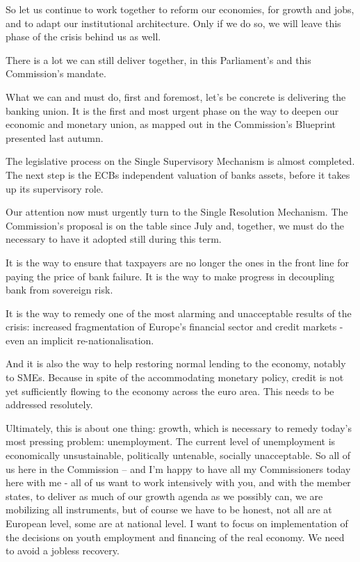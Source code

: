 \documentclass[a4paper,11pt]{article}
\begin{document}
So let us continue to work together to reform our economies, for growth and jobs, and to adapt our institutional architecture. Only if we do so, we will leave this phase of the crisis behind us as well.

There is a lot we can still deliver together, in this Parliament's and this Commission's mandate.

What we can and must do, first and foremost, let's be concrete is delivering the banking union. It is the first and most urgent phase on the way to deepen our economic and monetary union, as mapped out in the Commission's Blueprint presented last autumn.

The legislative process on the Single Supervisory Mechanism is almost completed. The next step is the ECBs independent valuation of banks assets, before it takes up its supervisory role.

Our attention now must urgently turn to the Single Resolution Mechanism. The Commission's proposal is on the table since July and, together, we must do the necessary to have it adopted still during this term.

It is the way to ensure that taxpayers are no longer the ones in the front line for paying the price of bank failure. It is the way to make progress in decoupling bank from sovereign risk.

It is the way to remedy one of the most alarming and unacceptable results of the crisis: increased fragmentation of Europe's financial sector and credit markets - even an implicit re-nationalisation.

And it is also the way to help restoring normal lending to the economy, notably to SMEs. Because in spite of the accommodating monetary policy, credit is not yet sufficiently flowing to the economy across the euro area. This needs to be addressed resolutely.

Ultimately, this is about one thing: growth, which is necessary to remedy today's most pressing problem: unemployment. The current level of unemployment is economically unsustainable, politically untenable, socially unacceptable. So all of us here in the Commission – and I'm happy to have all my Commissioners today here with me - all of us want to work intensively with you, and with the member states, to deliver as much of our growth agenda as we possibly can, we are mobilizing all instruments, but of course we have to be honest, not all are at European level, some are at national level. I want to focus on implementation of the decisions on youth employment and financing of the real economy. We need to avoid a jobless recovery.
\end{document}
